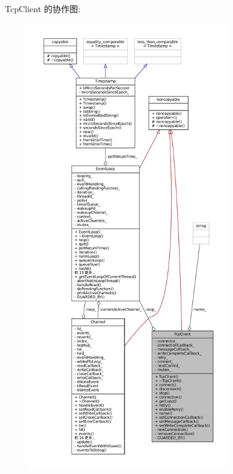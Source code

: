 Tcp\+Client 的协作图\+:
\nopagebreak
\begin{figure}[H]
\begin{center}
\leavevmode
\includegraphics[height=550pt]{classmuduo_1_1net_1_1TcpClient__coll__graph}
\end{center}
\end{figure}

